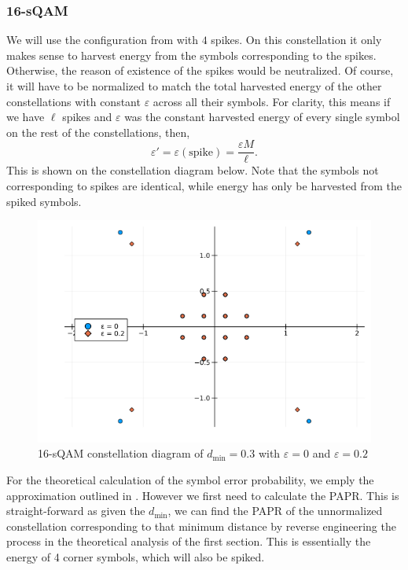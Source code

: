 \documentclass[11pt,a4paper,onecolumn,final]{article}
\newcommand{\dmin}{d_\text{min}}
\newcommand{\eps}{\varepsilon}
\begin{document}
\subsubsection*{16-sQAM}
We will use the configuration from \cite{sqam} with \(4\) spikes. On this constellation it only makes sense to harvest energy from the symbols corresponding to the spikes. Otherwise, the reason of existence of the spikes would be neutralized. Of course, it will have to be normalized to match the total harvested energy of the other constellations with constant \(\eps \) across all their symbols. For clarity, this means if we have \(\ell\) spikes and \(\eps \) was the constant harvested energy of every single symbol on the rest of the constellations, then, 
\begin{equation}
    \eps ' = \eps(\text{spike}) = \frac{\eps M }{\ell}. 
\end{equation}
This is shown on the constellation diagram below. Note that the symbols not corresponding to spikes are identical, while energy has only be harvested from the spiked symbols. 
\begin{figure}[h]
    \centering
    \includegraphics[scale=0.6]{16sqam_both0and02.png}
    \caption{16-sQAM constellation diagram of \(\dmin = 0.3\) with \(\eps = 0\) and \(\eps = 0.2\)}
\end{figure}


For the theoretical calculation of the symbol error probability, we emply the approximation outlined in \cite{sqam}. However we first need to calculate the PAPR. This is straight-forward as given the \(\dmin\), we can find the PAPR of the unnormalized constellation corresponding to that minimum distance by reverse engineering the process in the theoretical analysis of the first section. This is essentially the energy of 4 corner symbols, which will also be spiked. 
\end{document}
